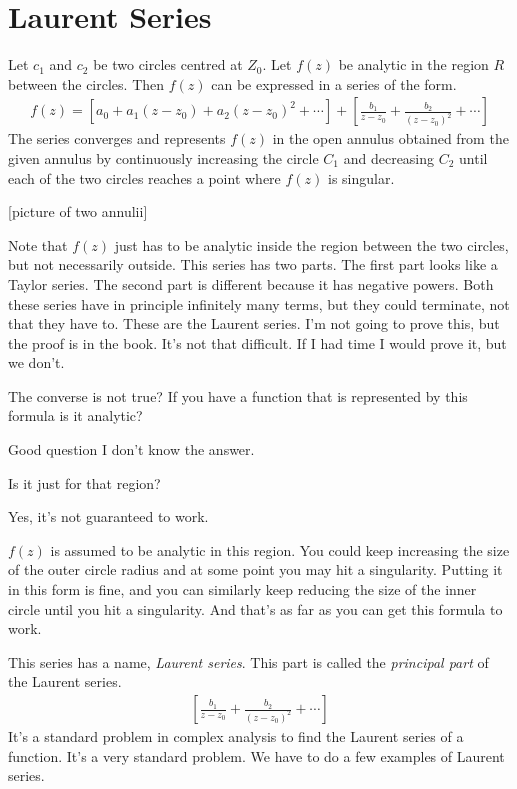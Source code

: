 \section{Laurent Series}
Let $c_1$ and $c_2$ be two circles centred at $Z_0$.
Let $f(z)$ be analytic in the region $R$ between the circles.
Then $f(z)$ can be expressed in a series of the form.
\begin{align}
    f(z) =
    \left[
        a_0 + a_1(z - z_0) + a_2(z - z_0)^2 + \cdots
    \right]
    + \left[
        \frac{b_1}{z - z_0}
        + \frac{b_2}{(z - z_0)^2}
        + \cdots
    \right]
\end{align}
The series converges and represents $f(z)$ in the open annulus obtained from the
given annulus by continuously increasing the circle $C_1$ and decreasing $C_2$
until each of the two circles reaches a point where $f(z)$ is singular.

[picture of two annulii]

Note that $f(z)$ just has to be analytic inside the region between the two
circles,
but not necessarily outside.
This series has two parts.
The first part looks like a Taylor series.
The second part is different because it has negative powers.
Both these series have in principle infinitely many terms,
but they could terminate,
not that they have to.
These are the Laurent series.
I'm not going to prove this,
but the proof is in the book.
It's not that difficult.
If I had time I would prove it, but we don't.

\begin{question}
    The converse is not true?
    If you have a function that is represented by this formula is it analytic?
\end{question}
Good question I don't know the answer.

\begin{question}
    Is it just for that region?
\end{question}
Yes, it's not guaranteed to work.

$f(z)$ is assumed to be analytic in this region.
You could keep increasing the size of the outer circle radius
and at some point you may hit a singularity.
Putting it in this form is fine,
and you can similarly keep reducing the size of the inner circle until you
hit a singularity.
And that's as far as you can get this formula to work.

This series has a name, \emph{Laurent series}.
This part is called the \emph{principal part} of the Laurent series.
\begin{align}
    \left[
        \frac{b_1}{z - z_0}
        + \frac{b_2}{{(z - z_0)}^2}
        + \cdots
    \right]
\end{align}
It's a standard problem in complex analysis to find the Laurent series of a
function.
It's a very standard problem.
We have to do a few examples of Laurent series.

